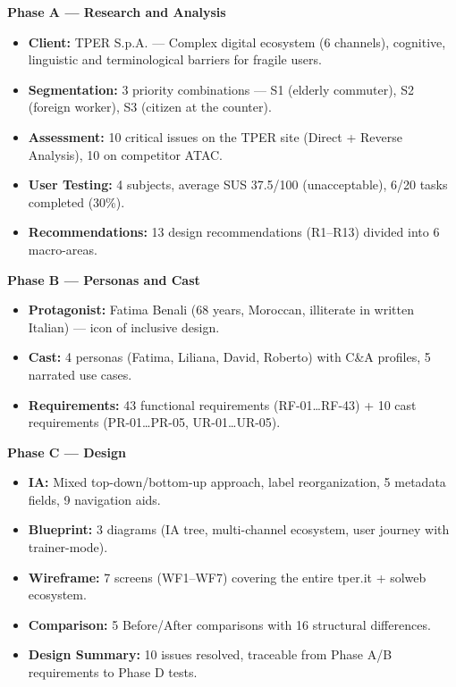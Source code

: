 ﻿\documentclass[11pt,a4paper]{article}
\begin{document}
\begin{tcolorbox}[sectionbox]
\small

\noindent\textbf{Phase A --- Research and Analysis}
\begin{itemize}[leftmargin=*]
  \item \textbf{Client:} TPER S.p.A. --- Complex digital ecosystem (6 channels), cognitive, linguistic and terminological barriers for fragile users.
  \item \textbf{Segmentation:} 3 priority combinations --- S1 (elderly commuter), S2 (foreign worker), S3 (citizen at the counter).
  \item \textbf{Assessment:} 10 critical issues on the TPER site (Direct + Reverse Analysis), 10 on competitor ATAC.
  \item \textbf{User Testing:} 4 subjects, average SUS 37.5/100 (unacceptable), 6/20 tasks completed (30\%).
  \item \textbf{Recommendations:} 13 design recommendations (R1--R13) divided into 6 macro-areas.
\end{itemize}

\vspace{0.2cm}

\noindent\textbf{Phase B --- Personas and Cast}
\begin{itemize}[leftmargin=*]
  \item \textbf{Protagonist:} Fatima Benali (68 years, Moroccan, illiterate in written Italian) --- icon of inclusive design.
  \item \textbf{Cast:} 4 personas (Fatima, Liliana, David, Roberto) with C\&A profiles, 5 narrated use cases.
  \item \textbf{Requirements:} 43 functional requirements (RF-01\ldots{}RF-43) + 10 cast requirements (PR-01\ldots{}PR-05, UR-01\ldots{}UR-05).
\end{itemize}

\vspace{0.2cm}

\noindent\textbf{Phase C --- Design}
\begin{itemize}[leftmargin=*]
  \item \textbf{IA:} Mixed top-down/bottom-up approach, label reorganization, 5 metadata fields, 9 navigation aids.
  \item \textbf{Blueprint:} 3 diagrams (IA tree, multi-channel ecosystem, user journey with trainer-mode).
  \item \textbf{Wireframe:} 7 screens (WF1--WF7) covering the entire tper.it + solweb ecosystem.
  \item \textbf{Comparison:} 5 Before/After comparisons with 16 structural differences.
  \item \textbf{Design Summary:} 10 issues resolved, traceable from Phase A/B requirements to Phase D tests.
\end{itemize}


\end{tcolorbox}
\end{document}
